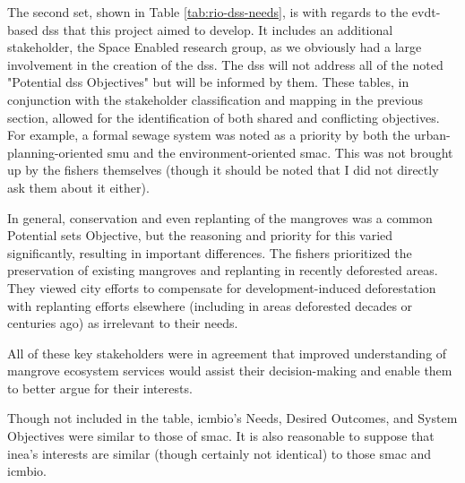 The second set, shown in Table \ref{tab:rio-dss-needs}, is with regards to the \ac{evdt}-based \ac{dss} that this project aimed to develop. It includes an additional stakeholder, the Space Enabled research group, as we obviously had a large involvement in the creation of the \ac{dss}. The \ac{dss} will not address all of the noted "Potential \ac{dss} Objectives" but will be informed by them. These tables, in conjunction with the stakeholder classification and mapping in the previous section, allowed for the identification of both shared and conflicting objectives. For example, a formal sewage system was noted as a priority by both the urban-planning-oriented \ac{smu} and the environment-oriented \ac{smac}. This was not brought up by the fishers themselves (though it should be noted that I did not directly ask them about it either).

In general, conservation and even replanting of the mangroves was a common Potential \ac{sets} Objective, but the reasoning and priority for this varied significantly, resulting in important differences. The fishers prioritized the preservation of existing mangroves and replanting in recently deforested areas. They viewed city efforts to compensate for development-induced deforestation with replanting efforts elsewhere (including in areas deforested decades or centuries ago) as irrelevant to their needs. 

All of these key stakeholders were in agreement that improved understanding of mangrove ecosystem services would assist their decision-making and enable them to better argue for their interests.  

Though not included in the table, \ac{icmbio}'s Needs, Desired Outcomes, and System Objectives were similar to those of \ac{smac}. It is also reasonable to suppose that \ac{inea}'s interests are similar (though certainly not identical) to those \ac{smac} and \ac{icmbio}.

